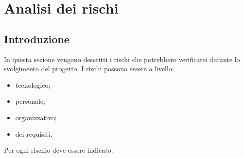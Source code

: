\section {Analisi dei rischi}
\label{sec:analisirischi}
\subsection {Introduzione}
In questa sezione vengono descritti i rischi che potrebbero verificarsi durante lo svolgimento del progetto.
I rischi possono essere a livello:
\begin{itemize}
	\item {tecnologico};
	\item {personale};
	\item {organizzativo};
	\item {dei requisiti}.
\end{itemize}
Per ogni rischio deve essere indicato:
